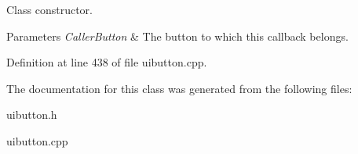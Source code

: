 Class constructor. 


\begin{DoxyParams}{Parameters}
{\em CallerButton} & The button to which this callback belongs. \\
\hline
\end{DoxyParams}


Definition at line 438 of file uibutton.cpp.



The documentation for this class was generated from the following files:\begin{DoxyCompactItemize}
\item 
uibutton.h\item 
uibutton.cpp\end{DoxyCompactItemize}
